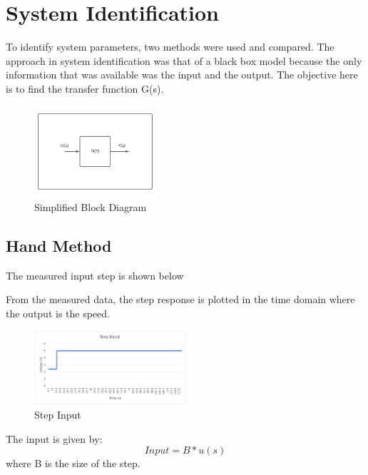 \documentclass[12pt]{article}
\begin{document}


\newpage

\section{\Large{System Identification}}
To identify system parameters, two methods were used and compared. The approach in system identification was that of a black box model because the only information that was available was the input and the output. The objective here is to find the transfer function G(s). 
\begin{figure}[H]
     \centering
     \includegraphics[width=0.4\textwidth]{transfer.png}
     \caption{Simplified Block Diagram}
     \label{fig:sample}
 \end{figure}



\subsection{\Large{Hand Method}}

The measured input step is shown below

From the measured data, the step response is plotted in the time domain where the output is the speed. 

\begin{figure}[H]
     \centering
     \includegraphics[width=0.5\textwidth]{inputstep.png}
     \caption{Step Input}
     \label{fig:sample}
 \end{figure}
 The input is given by:
\[
    Input = B*u(s)
\]
where B is the size of the step.
\end{document}
